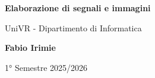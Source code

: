 \begin{titlepage}
	\begin{center}
		\vspace*{1cm}

		\Huge
		\textbf{Elaborazione di segnali e immagini}

		\vspace{0.5cm}
		\LARGE
		UniVR - Dipartimento di Informatica

		\vspace{1.5cm}

		\textbf{Fabio Irimie}

		\vfill


		\vspace{0.8cm}


		1° Semestre 2025/2026

	\end{center}
\end{titlepage}

